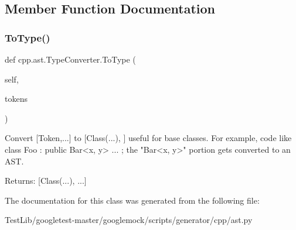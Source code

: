 \subsection{Member Function Documentation}
\mbox{\label{classcpp_1_1ast_1_1TypeConverter_aa6ea82e40cd30e5dfcd471ff144a19cf}} 
\subsubsection{\texorpdfstring{To\+Type()}{ToType()}}
{\footnotesize\ttfamily def cpp.\+ast.\+Type\+Converter.\+To\+Type (\begin{DoxyParamCaption}\item[{}]{self,  }\item[{}]{tokens }\end{DoxyParamCaption})}

\begin{DoxyVerb}Convert [Token,...] to [Class(...), ] useful for base classes.
For example, code like class Foo : public Bar<x, y> { ... };
the "Bar<x, y>" portion gets converted to an AST.

Returns:
  [Class(...), ...]
\end{DoxyVerb}
 

The documentation for this class was generated from the following file\+:\begin{DoxyCompactItemize}
\item 
Test\+Lib/googletest-\/master/googlemock/scripts/generator/cpp/ast.\+py\end{DoxyCompactItemize}
